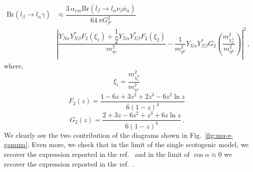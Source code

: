 \documentclass[12pt,letterpaper]{article}
\begin{document}
%
\begin{align}
\label{eq:mu-e-gamma}
\text{Br}(l_{\beta}\rightarrow l_{\alpha}\gamma) &\approx
\dfrac{3\,\alpha_{em}\text{Br}(l_{\beta}\rightarrow l_{\alpha}\nu_{\beta}\bar{\nu}_{\alpha})}{64\,\pi G_F^2 } \nonumber \\
&\left|\dfrac{Y_{N\alpha}Y_{N\beta}^* F_2\left(\xi_1\right)
+\dfrac{1}{2}Y_{\Sigma\alpha}Y_{\Sigma\beta}^* F_2\left(\xi_2\right)
}{m_{\eta^{\pm}}^2}
-\dfrac{1}{m_{\eta^{0}}^2}Y_{\Sigma\alpha}Y_{\Sigma\beta}^* G_2\left(\dfrac{m_{\chi^{\pm}_2}^2}{m_{\eta^{0}}^2}\right)
\right|^2 \,,
\end{align}
%
where,
%
\begin{equation}
\xi_i=\dfrac{ m_{\chi_i^0}^2 }{  m_{\eta^{\pm}}^2 }
\end{equation}
%
%
\begin{equation}
\label{eq:F2}
F_2(z)=\dfrac{1-6z+3z^2+2z^3-6z^2\ln{z}}{6(1-z)^4}
\end{equation}
%
\begin{equation}
\label{eq:G2}
G_2(z)=\dfrac{2+3z-6z^2+z^3+6z\ln{z}}{6(1-z)^4}\,.
\end{equation}
%
We clearly see the two contribution of the diagrams shown in Fig.~\ref{fig:mu-e-gamma}. Even more, we check that in the limit of the single scotogenic model, we recover the expression reported in the ref.~\cite{Ibarra:2016dlb} and in the limit of $\cos\alpha\approx 0$ we recover the expression reported in the ref.~\cite{Rocha-Moran:2016enp}.
%
\end{document}
